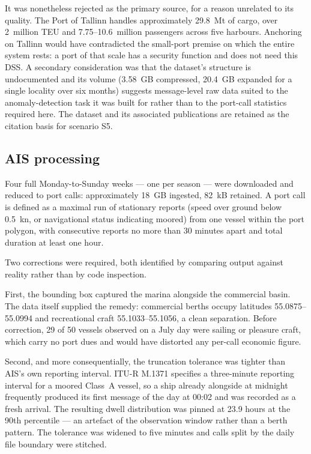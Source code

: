 \documentclass[conference]{IEEEtran}
\begin{document}
It was nonetheless rejected as the primary source, for a reason unrelated to its
quality. The Port of Tallinn handles approximately 29.8~Mt of cargo, over
2~million TEU and 7.75--10.6~million passengers across five harbours. Anchoring on
Tallinn would have contradicted the small-port premise on which the entire system
rests: a port of that scale has a security function and does not need this DSS.
A secondary consideration was that the dataset's structure is undocumented and its
volume (3.58~GB compressed, 20.4~GB expanded for a single locality over six months)
suggests message-level raw data suited to the anomaly-detection task it was built
for rather than to the port-call statistics required here. The dataset and its
associated publications are retained as the citation basis for scenario S5.

\subsection{AIS processing}

Four full Monday-to-Sunday weeks --- one per season --- were downloaded and reduced
to port calls: approximately 18~GB ingested, 82~kB retained. A port call is defined
as a maximal run of stationary reports (speed over ground below 0.5~kn, or
navigational status indicating moored) from one vessel within the port polygon,
with consecutive reports no more than 30 minutes apart and total duration at least
one hour.

Two corrections were required, both identified by comparing output against reality
rather than by code inspection.

First, the bounding box captured the marina alongside the commercial basin. The
data itself supplied the remedy: commercial berths occupy latitudes
55.0875--55.0994 and recreational craft 55.1033--55.1056, a clean separation. Before
correction, 29 of 50 vessels observed on a July day were sailing or pleasure craft,
which carry no port dues and would have distorted any per-call economic figure.

Second, and more consequentially, the truncation tolerance was tighter than AIS's
own reporting interval. ITU-R M.1371 specifies a three-minute reporting interval for
a moored Class~A vessel, so a ship already alongside at midnight frequently produced
its first message of the day at 00:02 and was recorded as a fresh arrival. The
resulting dwell distribution was pinned at 23.9 hours at the 90th percentile --- an
artefact of the observation window rather than a berth pattern. The tolerance was
widened to five minutes and calls split by the daily file boundary were stitched.
\end{document}

